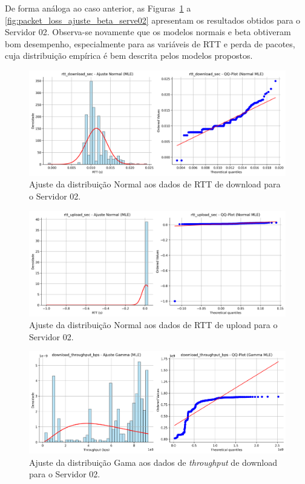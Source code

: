 \documentclass{article}
\begin{document}
De forma análoga ao caso anterior, as Figuras~\ref{fig:rtt_download_sec_ajuste_normal_server02}
a \ref{fig:packet_loss_ajuste_beta_serve02} apresentam os resultados obtidos
para o Servidor 02. Observa-se novamente que os modelos normais e beta obtiveram
bom desempenho, especialmente para as variáveis de RTT e perda de pacotes,
cuja distribuição empírica é bem descrita pelos modelos propostos.

\begin{figure}[H]
	\includegraphics[width=\textwidth]{../figures/mle/rtt_download_sec_ajuste_normal_server02.png}
	\caption{Ajuste da distribuição Normal aos dados de RTT de download para o Servidor 02.}
	\label{fig:rtt_download_sec_ajuste_normal_server02}
\end{figure}

\begin{figure}[htp]
	\includegraphics[width=\textwidth]{../figures/mle/rtt_upload_sec_ajuste_normal_server02.png}
	\caption{Ajuste da distribuição Normal aos dados de RTT de upload para o Servidor 02.}
	\label{fig:rtt_upload_sec_ajuste_normal_server02}
\end{figure}

\begin{figure}[htp]
	\includegraphics[width=\textwidth]{../figures/mle/download_throughput_bps_ajuste_gamma_server02.png}
	\caption{Ajuste da distribuição Gama aos dados de \textit{throughput} de download para o Servidor 02.}
	\label{fig:download_throughput_bps_ajuste_gamma_server02}
\end{figure}
\end{document}
